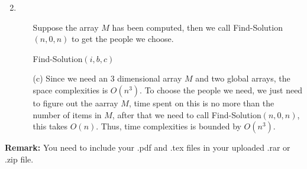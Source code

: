 \documentclass[12pt,a4paper]{article}
\makeatletter
\newtheorem*{solution}{Solution}
\theoremstyle{definition}
\renewenvironment{solution}[1][Solution] {\par\pushQED{\qed}\normalfont\topsep6\p@\@plus6\p@\relax\trivlist\item[\hskip\labelsep\bfseries#1\@addpunct{.}]\ignorespaces}{\popQED\endtrivlist\@endpefalse} \makeatother
\makeatother
\begin{document}
\begin{enumerate}
\begin{solution}
\begin{enumerate}
\begin{minipage}[t]{0.9\textwidth}
\begin{algorithm}[H]
						\;
					\end{algorithm}
				\end{minipage}
				Suppose the array $M$ has been computed, then we call Find-Solution$(n,0,n)$ to get the people we choose.\\
				\begin{minipage}[t]{0.9\textwidth}
					\centering
					\begin{algorithm}[H]
						\BlankLine
						\caption{Find-Solution$(i,b,c)$} \label{Alg-DP2}
						{
							\;
						}
						\Else
						{
							\;	
						}
					\end{algorithm}
				\end{minipage}
				\item[(c)] Since we need an $3$ dimensional array $M$ and two global arrays, the space complexities is $O(n^3)$. To choose the people we need, we just need to figure out the aarray $M$, time spent on this is no more than the number of items in $M$, after that we need to call Find-Solution$(n,0,n)$, this takes $O(n)$. Thus, time complexities is bounded by $O(n^3)$.
			\end{enumerate}
		\end{solution}
	\end{enumerate}
	
	
	\vspace{20pt}
	
	\textbf{Remark:} You need to include your .pdf and .tex files in your uploaded .rar or .zip file.
	
\end{document}
